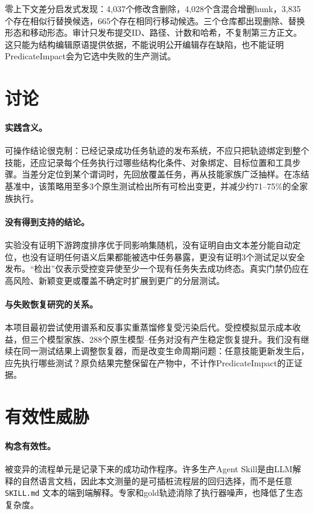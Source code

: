 \documentclass[10pt]{article}
\begin{document}
零上下文差分启发式发现：4,037个修改含删除，4,028个含混合增删hunk，3,835个存在相似行替换候选，665个存在相同行移动候选。三个仓库都出现删除、替换形态和移动形态。审计只发布提交ID、路径、计数和哈希，不复制第三方正文。这只能为结构编辑原语提供依据，不能说明公开编辑存在缺陷，也不能证明PredicateImpact会为它选中失败的生产测试。

\section{讨论}
\paragraph{实践含义。}
可操作结论很克制：已经记录成功任务轨迹的发布系统，不应只把轨迹绑定到整个技能，还应记录每个任务执行过哪些结构化条件、对象绑定、目标位置和工具步骤。当差分定位到某个谓词时，先回放覆盖任务，再从技能家族广泛抽样。在冻结基准中，该策略用至多3个原生测试检出所有可检出变更，并减少约71--75\%的全家族执行。

\paragraph{没有得到支持的结论。}
实验没有证明下游跨度排序优于同影响集随机，没有证明自由文本差分能自动定位，也没有证明任何语义后果都能被选中任务暴露，更没有证明3个测试足以安全发布。“检出”仅表示受控变异使至少一个现有任务失去成功终态。真实门禁仍应在高风险、新颖变更或覆盖不确定时扩展到更广的分层测试。

\paragraph{与失败恢复研究的关系。}
本项目最初尝试使用谱系和反事实重蒸馏修复受污染后代。受控模拟显示成本收益，但三个模型家族、288个原生模型--任务对没有产生稳定恢复提升。我们没有继续在同一测试结果上调整恢复器，而是改变生命周期问题：任意技能更新发生后，应先执行哪些测试？原负结果完整保留在产物中，不计作PredicateImpact的正证据。

\section{有效性威胁}
\paragraph{构念有效性。}
被变异的流程单元是记录下来的成功动作程序。许多生产Agent Skill是由LLM解释的自然语言文档，因此本文测量的是可插桩流程层的回归选择，而不是任意 \texttt{SKILL.md} 文本的端到端解释。专家和gold轨迹消除了执行器噪声，也降低了生态复杂度。
\end{document}
